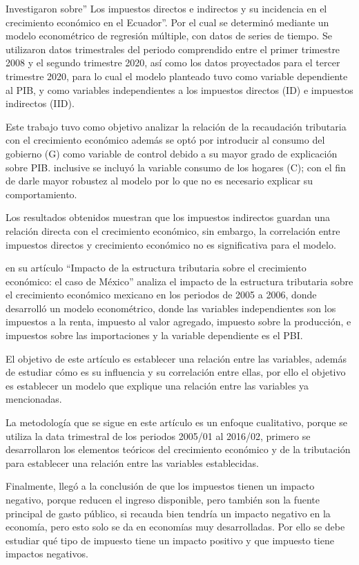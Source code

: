 \documentclass[
  letterpaper,
]{article}
\begin{document}
\textcite{beltran-ayala_impuestos_2020} Investigaron sobre'' Los
impuestos directos e indirectos y su incidencia en el crecimiento
económico en el Ecuador''. Por el cual se determinó mediante un modelo
econométrico de regresión múltiple, con datos de series de tiempo. Se
utilizaron datos trimestrales del periodo comprendido entre el primer
trimestre 2008 y el segundo trimestre 2020, así como los datos
proyectados para el tercer trimestre 2020, para lo cual el modelo
planteado tuvo como variable dependiente al PIB, y como variables
independientes a los impuestos directos (ID) e impuestos indirectos
(IID).

Este trabajo tuvo como objetivo analizar la relación de la recaudación
tributaria con el crecimiento económico además se optó por introducir al
consumo del gobierno (G) como variable de control debido a su mayor
grado de explicación sobre PIB. inclusive se incluyó la variable consumo
de los hogares (C); con el fin de darle mayor robustez al modelo por lo
que no es necesario explicar su comportamiento.

Los resultados obtenidos muestran que los impuestos indirectos guardan
una relación directa con el crecimiento económico, sin embargo, la
correlación entre impuestos directos y crecimiento económico no es
significativa para el modelo.

\textcite{banda-ortiz_impacto_2018} en su artículo ``Impacto de la
estructura tributaria sobre el crecimiento económico: el caso de
México'' analiza el impacto de la estructura tributaria sobre el
crecimiento económico mexicano en los periodos de 2005 a 2006, donde
desarrolló un modelo econométrico, donde las variables independientes
son los impuestos a la renta, impuesto al valor agregado, impuesto sobre
la producción, e impuestos sobre las importaciones y la variable
dependiente es el PBI.

El objetivo de este artículo es establecer una relación entre las
variables, además de estudiar cómo es su influencia y su correlación
entre ellas, por ello el objetivo es establecer un modelo que explique
una relación entre las variables ya mencionadas.

La metodología que se sigue en este artículo es un enfoque cualitativo,
porque se utiliza la data trimestral de los periodos 2005/01 al 2016/02,
primero se desarrollaron los elementos teóricos del crecimiento
económico y de la tributación para establecer una relación entre las
variables establecidas.

Finalmente, llegó a la conclusión de que los impuestos tienen un impacto
negativo, porque reducen el ingreso disponible, pero también son la
fuente principal de gasto público, si recauda bien tendría un impacto
negativo en la economía, pero esto solo se da en economías muy
desarrolladas. Por ello se debe estudiar qué tipo de impuesto tiene un
impacto positivo y que impuesto tiene impactos negativos.
\end{document}
